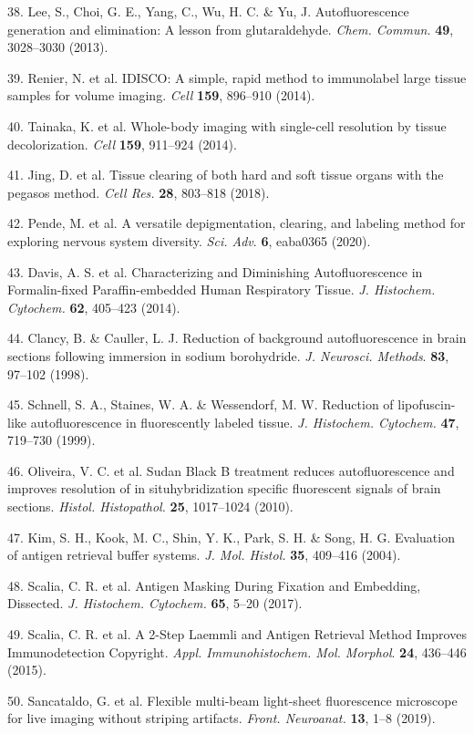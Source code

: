 \documentclass{article}
\begin{document}
\begin{hangpars}
38. Lee, S., Choi, G. E., Yang, C., Wu, H. C. \& Yu, J. Autofluorescence generation and elimination: A lesson from glutaraldehyde. \emph{Chem. Commun.} \textbf{49}, 3028–3030 (2013).

39. Renier, N. et al. IDISCO: A simple, rapid method to immunolabel large tissue samples for volume imaging. \emph{Cell} \textbf{159}, 896–910 (2014).

40. Tainaka, K. et al. Whole-body imaging with single-cell resolution by tissue decolorization. \emph{Cell} \textbf{159}, 911–924 (2014).

41. Jing, D. et al. Tissue clearing of both hard and soft tissue organs with the pegasos method. \emph{Cell Res.} \textbf{28}, 803–818 (2018).

42. Pende, M. et al. A versatile depigmentation, clearing, and labeling method for exploring nervous system diversity. \emph{Sci. Adv}. \textbf{6}, eaba0365 (2020).

43. Davis, A. S. et al. Characterizing and Diminishing Autofluorescence in Formalin-fixed Paraffin-embedded Human Respiratory Tissue. \emph{J. Histochem. Cytochem.} \textbf{62}, 405–423 (2014).

44. Clancy, B. \& Cauller, L. J. Reduction of background autofluorescence in brain sections following immersion in sodium borohydride. \emph{J. Neurosci. Methods}. \textbf{83}, 97–102 (1998).

45. Schnell, S. A., Staines, W. A. \& Wessendorf, M. W. Reduction of lipofuscin-like autofluorescence in fluorescently labeled tissue. \emph{J. Histochem. Cytochem.} \textbf{47}, 719–730 (1999).

46. Oliveira, V. C. et al. Sudan Black B treatment reduces autofluorescence and improves resolution of in situhybridization specific fluorescent signals of brain sections. \emph{Histol. Histopathol.} \textbf{25}, 1017–1024 (2010).

47. Kim, S. H., Kook, M. C., Shin, Y. K., Park, S. H. \& Song, H. G. Evaluation of antigen retrieval buffer systems. \emph{J. Mol. Histol.} \textbf{35}, 409–416 (2004).

48. Scalia, C. R. et al. Antigen Masking During Fixation and Embedding, Dissected. \emph{J. Histochem. Cytochem.} \textbf{65}, 5–20 (2017).

49. Scalia, C. R. et al. A 2-Step Laemmli and Antigen Retrieval Method Improves Immunodetection Copyright. \emph{Appl. Immunohistochem. Mol. Morphol}. \textbf{24}, 436–446 (2015).

50. Sancataldo, G. et al. Flexible multi-beam light-sheet fluorescence microscope for live imaging without striping artifacts. \emph{Front. Neuroanat.} \textbf{13}, 1–8 (2019).


\end{hangpars}
\end{document}

